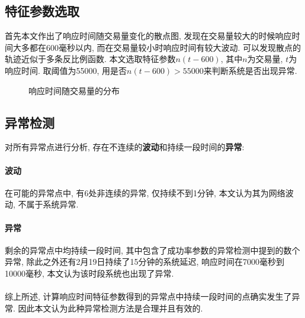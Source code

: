 \subsection{特征参数选取}

首先本文作出了响应时间随交易量变化的散点图, 发现在交易量较大的时候响应时间大多都在600毫秒以内, 而在交易量较小时响应时间有较大波动. 可以发现散点的轨迹近似于多条反比例函数. 本文选取特征参数$n(t-600)$, 其中$n$为交易量, $t$为响应时间. 取阈值为55000, 用是否$n(t-600)>55000$来判断系统是否出现异常.

\begin{figure}[htb]
    \centering
    \caption{响应时间随交易量的分布}
\end{figure}

\subsection{异常检测}

对所有异常点进行分析, 存在不连续的\textbf{波动}和持续一段时间的\textbf{异常}:

\paragraph{波动} 在可能的异常点中, 有6处非连续的异常, 仅持续不到1分钟, 本文认为其为网络波动, 不属于系统异常.

\paragraph{异常} 剩余的异常点中均持续一段时间, 其中包含了成功率参数的异常检测中提到的数个异常, 除此之外还有2月19日持续了15分钟的系统延迟, 响应时间在7000毫秒到10000毫秒, 本文认为该时段系统也出现了异常.

\paragraph{\quad}综上所述, 计算响应时间特征参数得到的异常点中持续一段时间的点确实发生了异常. 因此本文认为此种异常检测方法是合理并且有效的.
